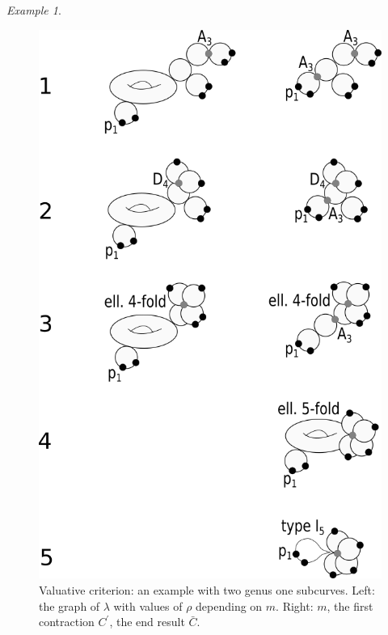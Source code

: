 \documentclass{compositio}
\theoremstyle{plain}
\theoremstyle{definition}
\theoremstyle{remark}
\newtheorem{exa}[thm]{Example}
\begin{document}
\begin{exa}
\begin{figure}[htb]
\begin{minipage}[l]{.45\textwidth}
   \end{minipage}
   \begin{minipage}[r]{.45\textwidth}
    \includegraphics[width=.9\textwidth]{properness}
   \end{minipage}
   \caption{Valuative criterion: an example with two genus one subcurves. Left: the graph of $\lambda$ with values of $\rho$ depending on $m$. Right: $m$, the first contraction $C^\prime$, the end result $\bar C$.}
   \label{fig:example_properness}
  \end{figure}

\end{exa}
\end{document}
